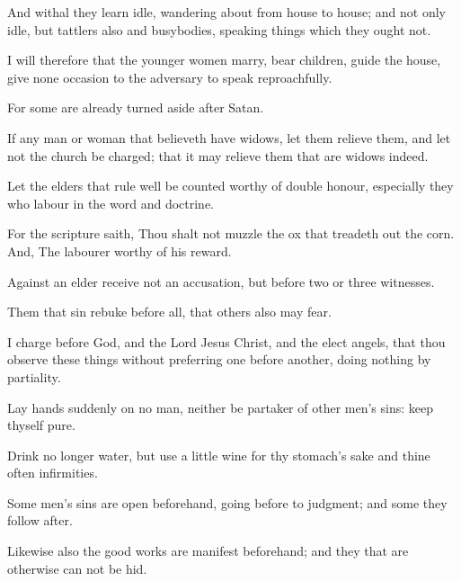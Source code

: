 {And
withal they
learn
{}
idle, wandering
about from house to
house;
and
not
only
idle,
but
tattlers
also
and
busybodies,
speaking things
which they
ought
not.

I
will
therefore
that the younger
women
marry, bear
children, guide the
house,
give
none
occasion to the
adversary to speak
reproachfully.

For
some
are
already turned
aside
after
Satan.

If
any
man
or
woman that
believeth
have
widows, let them
relieve
them,
and
let
not the
church be
charged;
that it may
relieve them
that
are
widows
indeed.

Let the
elders that
rule
well be counted
worthy of
double
honour,
especially they who
labour
in the
word
and
doctrine.

For the
scripture
saith, Thou
shalt
not
muzzle the
ox that treadeth out the
corn.
And, The
labourer
{}
worthy of
his
reward.

Against an
elder
receive
not an
accusation,
but
before
two
or
three
witnesses.

Them that
sin
rebuke
before
all,
that
others
also
may
fear.

I
charge
{}
before
God,
and the
Lord
Jesus
Christ,
and the
elect
angels,
that thou
observe these
things
without preferring one before
another,
doing
nothing
by
partiality.

Lay
hands
suddenly
on no
man,
neither be partaker
of other
men’s
sins:
keep
thyself
pure.

Drink no
longer
water,
but
use a
little
wine
for
thy
stomach’s
sake
and
thine
often
infirmities.

Some
men’s
sins
are open
beforehand, going
before
to
judgment;
and
some
{} they follow
after.

Likewise
also the
good
works
{}
are manifest
beforehand;
and they that
are
otherwise
can
not be
hid.




\par }
